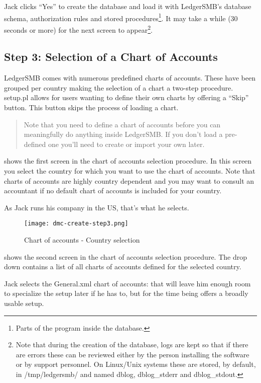Jack clicks ``Yes'' to create the database and load it with LedgerSMB's database
schema, authorization rules and stored
procedures\footnote{Parts of the program inside the database.}. It may
take a while (30 seconds or more) for the next screen to appear\footnote{Note 
that during the creation of the database, logs are kept so that if there are
errors these can be reviewed either by the person installing the software or by
support personnel.  On Linux/Unix systems these are stored, by default, in
/tmp/ledgersmb/ and named dblog, dblog\_stderr and dblog\_stdout.}.

\subsection{Step 3: Selection of a Chart of Accounts}
\label{subsec-create-setup-select-coa}

LedgerSMB comes with numerous predefined charts of accounts. These have been grouped
per country making the selection of a chart a two-step procedure. setup.pl allows for
users wanting to define their own charts by offering a ``Skip'' button. This button
skips the process of loading a chart.

\begin{quote}
Note that you need to define a chart of accounts before you can meaningfully do anything
inside LedgerSMB. If you don't load a pre-defined one you'll need to create or import your
own later.
\end{quote}

 shows the first screen in the chart of accounts selection procedure.
In this screen you select the country for which you want to use the chart of accounts. Note
that charts of accounts are highly country dependent and you may want to consult
an accountant if no default chart of accounts is included for your country.

As Jack runs his company in the US, that's what he selects.

\begin{figure}[h]
\centering
\texttt{[image: dmc-create-step3.png]}
\caption{Chart of accounts - Country selection}
\label{fig:setup-step3}
\end{figure}

 shows the second screen in the chart of accounts selection procedure.
The drop down contains a list of all charts of accounts defined for the selected country.

Jack selects the General.xml chart of accounts: that will leave him enough room to specialize
the setup later if he has to, but for the time being offers a broadly usable setup.

